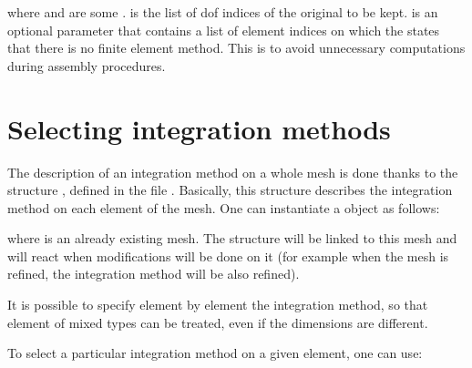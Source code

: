 \documentclass[a4paper,11pt,english]{sphinxmanual}
\begin{document}
where  and  are some .  is the
list of dof indices of the original   to be kept.  is an
optional parameter that contains a list of element indices on which the
 states that there is no finite element method. This
is to avoid unnecessary computations during assembly procedures.


\chapter{Selecting integration methods}
\label{\detokenize{userdoc/binteg:selecting-integration-methods}}\label{\detokenize{userdoc/binteg:ud-binteg}}\label{\detokenize{userdoc/binteg::doc}}
The description of an integration method on a whole mesh is done thanks to the
structure , defined in the file .
Basically, this structure describes the integration method on each element of the
mesh. One can instantiate a  object as follows:

\begin{sphinxVerbatim}[commandchars=\\\{\}]
 
\end{sphinxVerbatim}

where  is an already existing mesh. The structure will be linked to this
mesh and will react when modifications will be done on it (for example when the
mesh is refined, the integration method will be also refined).

It is possible to specify element by element the integration method, so that
element of mixed types can be treated, even if the dimensions are different.

To select a particular integration method on a given element, one can use:

\begin{sphinxVerbatim}[commandchars=\\\{\}]
 
\end{sphinxVerbatim}
\end{document}
